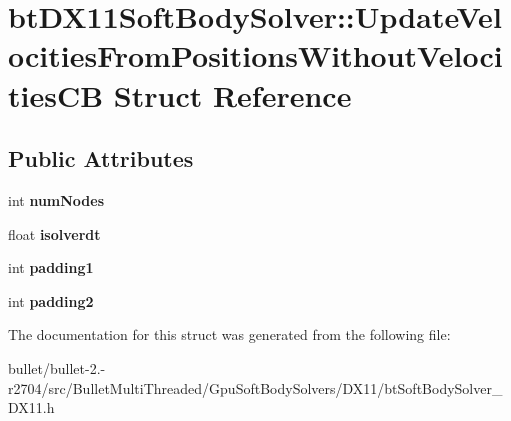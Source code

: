 \hypertarget{structbt_d_x11_soft_body_solver_1_1_update_velocities_from_positions_without_velocities_c_b}{\section{bt\+D\+X11\+Soft\+Body\+Solver\+:\+:Update\+Velocities\+From\+Positions\+Without\+Velocities\+C\+B Struct Reference}
\label{structbt_d_x11_soft_body_solver_1_1_update_velocities_from_positions_without_velocities_c_b}
}
\subsection*{Public Attributes}
\begin{DoxyCompactItemize}
\item 
\hypertarget{structbt_d_x11_soft_body_solver_1_1_update_velocities_from_positions_without_velocities_c_b_afa7d5635891ac971d8f4195c1c060808}{int {\bfseries num\+Nodes}}\label{structbt_d_x11_soft_body_solver_1_1_update_velocities_from_positions_without_velocities_c_b_afa7d5635891ac971d8f4195c1c060808}

\item 
\hypertarget{structbt_d_x11_soft_body_solver_1_1_update_velocities_from_positions_without_velocities_c_b_a5c0bdf0a6753765a41790da44144f0df}{float {\bfseries isolverdt}}\label{structbt_d_x11_soft_body_solver_1_1_update_velocities_from_positions_without_velocities_c_b_a5c0bdf0a6753765a41790da44144f0df}

\item 
\hypertarget{structbt_d_x11_soft_body_solver_1_1_update_velocities_from_positions_without_velocities_c_b_a43a6da7c2f14a5cf8e68b3f596639eef}{int {\bfseries padding1}}\label{structbt_d_x11_soft_body_solver_1_1_update_velocities_from_positions_without_velocities_c_b_a43a6da7c2f14a5cf8e68b3f596639eef}

\item 
\hypertarget{structbt_d_x11_soft_body_solver_1_1_update_velocities_from_positions_without_velocities_c_b_ac67ec67eb2f630193117cf6984ccb027}{int {\bfseries padding2}}\label{structbt_d_x11_soft_body_solver_1_1_update_velocities_from_positions_without_velocities_c_b_ac67ec67eb2f630193117cf6984ccb027}

\end{DoxyCompactItemize}


The documentation for this struct was generated from the following file\+:\begin{DoxyCompactItemize}
\item 
bullet/bullet-\/2.-\/r2704/src/\+Bullet\+Multi\+Threaded/\+Gpu\+Soft\+Body\+Solvers/\+D\+X11/bt\+Soft\+Body\+Solver\+\_\+\+D\+X11.\+h\end{DoxyCompactItemize}
